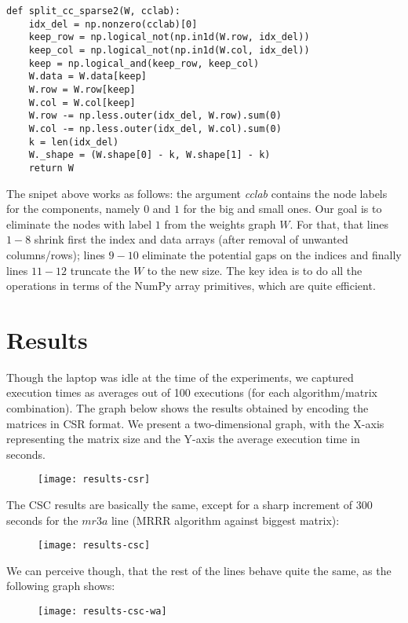     \begin{lstlisting}
def split_cc_sparse2(W, cclab):
    idx_del = np.nonzero(cclab)[0]
    keep_row = np.logical_not(np.in1d(W.row, idx_del))
    keep_col = np.logical_not(np.in1d(W.col, idx_del))
    keep = np.logical_and(keep_row, keep_col)
    W.data = W.data[keep]
    W.row = W.row[keep]
    W.col = W.col[keep]
    W.row -= np.less.outer(idx_del, W.row).sum(0)
    W.col -= np.less.outer(idx_del, W.col).sum(0)
    k = len(idx_del)
    W._shape = (W.shape[0] - k, W.shape[1] - k)
    return W
    \end{lstlisting}

The snipet above works as follows: the argument
\emph{cclab} contains the node labels for the components, namely $0$ and $1$
for the big and small ones. Our goal is to eliminate the nodes with
label $1$ from the weights graph $W$. For that, that lines $1-8$
shrink first the index and data arrays (after removal of unwanted
columns/rows); lines $9-10$ eliminate the potential gaps on the
indices and finally lines $11-12$ truncate the $W$ to the new
size. The key idea is to do all the operations in terms of the NumPy
array primitives, which are quite efficient. 
    
\section{Results}

Though the laptop was idle at the time of the experiments, we captured
execution times as averages out of 100 executions (for each
algorithm/matrix combination). The graph below shows the results
obtained by encoding the matrices in CSR format. We present a
two-dimensional graph, with the X-axis representing the matrix size
and the Y-axis the average execution time in seconds. 

\begin{figure}[H]
  \centering
  \texttt{[image: results-csr]}
\end{figure}

The CSC results are basically the same, except for a sharp increment of 300
seconds for the $mr3a$ line (MRRR algorithm against biggest matrix):

\begin{figure}[H]
  \centering
  \texttt{[image: results-csc]}
\end{figure}

We can perceive though, that the rest of the lines behave quite the
same, as the following graph shows:

\begin{figure}[H]
  \centering
  \texttt{[image: results-csc-wa]}
\end{figure}
